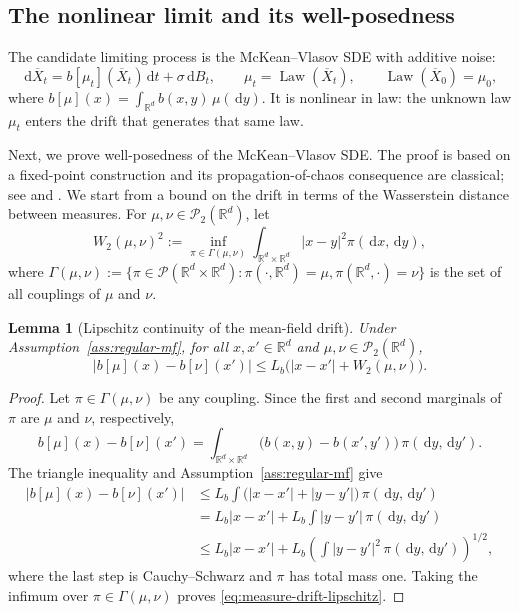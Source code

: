 \documentclass[11pt]{amsart}
\numberwithin{equation}{section}
\theoremstyle{plain}
\newtheorem{lemma}[theorem]{Lemma}
\newcommand{\R}{\mathbb{R}}
\newcommand{\cP}{\mathcal{P}}
\newcommand{\dd}{\,\mathrm{d}}
\newcommand{\abs}[1]{\left\lvert#1\right\rvert}
\DeclareMathOperator{\Law}{Law}
\begin{document}
\subsection{The nonlinear limit and its well-posedness}
The candidate limiting process is the McKean--Vlasov SDE with additive noise:
\begin{equation}\label{eq:mv-sde}
  \dd\overline X_t=b[\mu_t](\overline X_t)\dd t+\sigma\dd B_t,
  \qquad \mu_t=\Law(\overline X_t),\qquad
  \Law(\overline X_0)=\mu_0, 
\end{equation}
where $ b[\mu](x)=\int_{\R^d}b(x,y)\,\mu(\dd y)$. 
It is nonlinear in law: the unknown law $\mu_t$ enters the drift that generates that same law. 

Next, we prove well-posedness of the McKean--Vlasov SDE.  The proof is based on a fixed-point construction and its propagation-of-chaos consequence are classical; see \cite{Sznitman1991} and \cite{CarmonaDelarue2018}. We start from a bound on the drift in terms of the Wasserstein distance between measures. 
For $\mu,\nu\in\cP_2(\R^d)$, let
\[
 W_2(\mu,\nu)^2
 :=\inf_{\pi\in\Gamma(\mu,\nu)}
   \int_{\R^d\times\R^d}\abs{x-y}^2\pi(\dd x,\dd y), 
\]
where $\Gamma(\mu,\nu):= \{ \pi \in \mathcal{P}(\R^d \times \R^d) : \pi(\cdot, \R^d) = \mu, \pi(\R^d, \cdot) = \nu \}$ is the set of all couplings of $\mu$ and $\nu$. 


\begin{lemma}[Lipschitz continuity of the mean-field drift]
\label{lem:measure-drift-lipschitz}
Under Assumption~\ref{ass:regular-mf}, for all
$x,x'\in\R^d$ and $\mu,\nu\in\cP_2(\R^d)$,
\begin{equation}\label{eq:measure-drift-lipschitz}
 \abs{b[\mu](x)-b[\nu](x')}
 \leq L_b\bigl(\abs{x-x'}+W_2(\mu,\nu)\bigr).
\end{equation}
\end{lemma}
\begin{proof}
Let $\pi\in\Gamma(\mu,\nu)$ be any coupling.  Since the first and second
marginals of $\pi$ are $\mu$ and $\nu$, respectively,
\[
 b[\mu](x)-b[\nu](x')
 =\int_{\R^d\times\R^d}
   \bigl(b(x,y)-b(x',y')\bigr)\,\pi(\dd y,\dd y').
\]
The triangle inequality and Assumption~\ref{ass:regular-mf} give
\begin{align*}
 \abs{b[\mu](x)-b[\nu](x')}
 &\leq L_b\int
   \bigl(\abs{x-x'}+\abs{y-y'}\bigr)\,\pi(\dd y,\dd y')\\
 &=L_b\abs{x-x'}
   +L_b\int\abs{y-y'}\,\pi(\dd y,\dd y')\\
 &\leq L_b\abs{x-x'}
   +L_b\left(\int\abs{y-y'}^2\,\pi(\dd y,\dd y')\right)^{1/2},
\end{align*}
where the last step is Cauchy--Schwarz and $\pi$ has total mass one.
Taking the infimum over $\pi\in\Gamma(\mu,\nu)$ proves
\eqref{eq:measure-drift-lipschitz}.
\end{proof}
\end{document}
